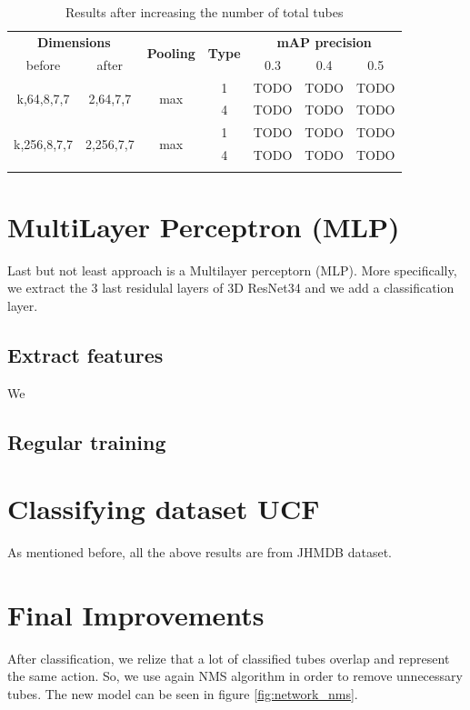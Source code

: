 \documentclass{report}
\begin{document}
\begin{center}
\begin{longtable}{||c | c| c| c||c c c||}

  \hline
 \multicolumn{2}{||c|}{\textbf{Dimensions}} & \multirow{2}{*}{\textbf{Pooling}} &\multirow{2}{*}{ \textbf{Type}} &\multicolumn{3}{|c||}{\textbf{mAP precision}}\\

  before & after & {} & {} & 0.3 &  0.4 & 0.5 \\
  \hline   \hline

  \multirow{2}{*}{k,64,8,7,7} & \multirow{2}{*}{2,64,7,7} & \multirow{2}{*}{max}  & 1 & TODO & TODO & TODO \\
  \cline{4-7}
  {} & {} & {} & 4 & TODO & TODO & TODO   \\
  \hline   
  \multirow{2}{*}{k,256,8,7,7} & \multirow{2}{*}{2,256,7,7} & \multirow{2}{*}{max}  & 1 & TODO & TODO & TODO \\
  \cline{4-7}
  {} & {} & {} & 4 & TODO & TODO & TODO   \\
  \hline   
  \caption{Results after increasing the number of total tubes }
  \label{table:svm_increased}

\end{longtable} 
\end{center}

\section{MultiLayer Perceptron (MLP)}
Last but not least approach is a Multilayer perceptorn (MLP). More specifically, we extract the 3 last residulal layers of 3D ResNet34
and we add a classification layer.  

\subsection{Extract features}
We

\subsection{Regular training}

\section{Classifying dataset UCF}
As mentioned before, all the above results are from JHMDB dataset. 
\section{Final Improvements}
After classification, we relize that a lot of classified tubes overlap and represent the same action. So, we use again NMS algorithm in order
to remove unnecessary tubes. The new model can be seen in figure \ref{fig:network_nms}.
\end{document}
